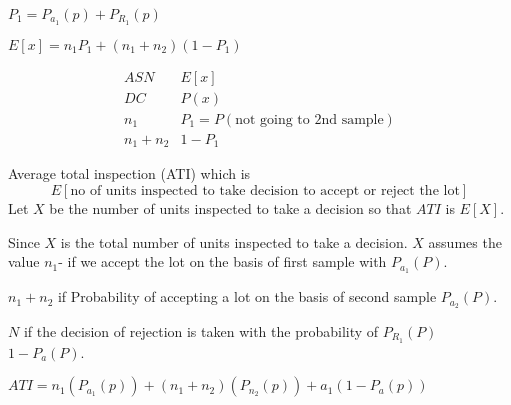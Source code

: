 \documentclass[oneside,11pt,pdftex]{book}%
\numberwithin{equation}{section}
\numberwithin{section}{chapter}
\numberwithin{equation}{chapter}
\begin{document}
$ P_1=P_{a_1}(p)+P_{R_1}(p) $

$ E[x]=n_1P_1+(n_1+n_2)(1-P_1) $

\[ \begin{matrix}
	ASN & E[x]\\
	DC & P(x)\\
	n_1 & P_1=P(\text{not going to 2nd sample})\\
	n_1+n_2 & 1-P_1

\end{matrix} \]

Average total inspection (ATI) which is 
\[ 	E[\text{no of units inspected to take decision to accept or reject the lot}] \]
Let $ X $ be the number of units inspected to take a decision so that $ ATI $ is $ E[X] $.

Since $ X $ is the total number of units inspected to take a decision. $ X $ assumes the value $ n_1 $- if we accept the lot on the basis of first sample with $ P_{a_1}(P) $.

$ n_1+n_2 $ if Probability of accepting a lot on the basis of second sample $ P_{a_2}(P) $. 

$ N $ if the decision of rejection is taken with the probability of $ P_{R_1} (P) $
$ 1-P_a(P) $.


$ ATI=n_1(P_{a_1}(p)) +(n_1+n_2)(P_{n_2}(p))+a_1(1-P_a(p))$










\backmatter
\end{document}

